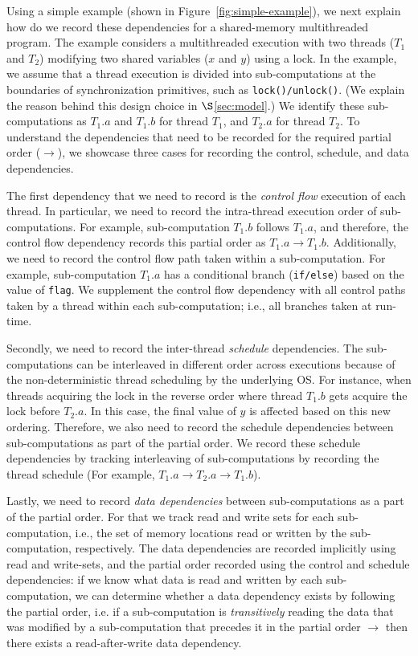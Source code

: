 


 Using a simple example (shown in Figure~\ref{fig:simple-example}), we next explain how do we record these dependencies for a shared-memory multithreaded program. The example considers a multithreaded execution with two threads ($T_1$ and $T_2$) modifying two shared variables ($x$ and $y$) using a lock. In the example, we assume that a thread execution is divided into sub-computations at the boundaries of synchronization primitives, such as {\tt lock()/unlock()}. (We explain the reason behind this design choice in $\S$\ref{sec:model}.) We identify these sub-computations as $T_1.a$ and $T_1.b$ for thread $T_1$, and $T_2.a$ for thread $T_2$.   To understand the dependencies that need to be recorded for the required partial order ($\rightarrow$), we showcase three cases for recording the control, schedule, and data dependencies.

The first dependency that we need to record is the {\em control flow} execution of each thread. In particular, we need to record the intra-thread execution order of sub-computations. For example, sub-computation $T_1.b$ follows $T_1.a$, and therefore, the control flow dependency records this partial order as $T_1.a \rightarrow T_1.b$. Additionally, we need to record the control flow path taken within a sub-computation. For example, sub-computation  $T_1.a$ has a conditional branch ({\tt if/else}) based on the value of {\tt flag}. We supplement the control flow dependency with all control paths taken by a thread within each sub-computation; i.e.,  all branches taken at run-time.

Secondly, we need to record the inter-thread {\em schedule} dependencies. The sub-computations can be interleaved in different order across executions because of the non-deterministic thread scheduling by the underlying OS. For instance, when threads acquiring the lock in the reverse order where thread $T_1.b$ gets acquire the lock before $T_2.a$. In this case, the final value of $y$ is affected based on this new ordering. Therefore, we also need to record the schedule dependencies between sub-computations as part of the partial order. We record these schedule dependencies by tracking interleaving of sub-computations by recording the thread schedule (For example, $T_1.a   \rightarrow   T_2.a \rightarrow T_1.b $).

Lastly,   we need to record {\em data dependencies} between sub-computations as a part of the partial order. For that we track read and write sets for each sub-computation, i.e., the set of memory locations read or written by the sub-computation, respectively. The data dependencies are recorded implicitly using read and write-sets, and the partial order recorded using the control and schedule dependencies: if we know what data is read and written by each sub-computation, we can determine whether a data dependency exists by following the partial order, i.e. if a sub-computation is {\em transitively} reading the data that was modified by a sub-computation that precedes it in the partial order $\rightarrow$ then there exists a read-after-write data dependency. 

